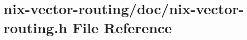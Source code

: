\hypertarget{nix-vector-routing_8h}{}\section{nix-\/vector-\/routing/doc/nix-\/vector-\/routing.h File Reference}
\label{nix-vector-routing_8h}
